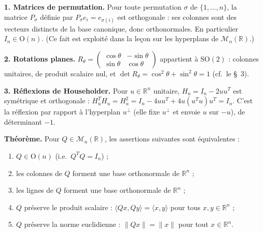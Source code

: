 
\begin{mdframed}[style=exbar]
  \textbf{1. Matrices de permutation.}\enspace%
  Pour toute permutation $\sigma$ de $\{1,\ldots,n\}$, la matrice $P_\sigma$
  définie par $P_\sigma e_i = e_{\sigma(i)}$ est orthogonale : ses colonnes sont
  des vecteurs distincts de la base canonique, donc orthonormales. En
  particulier $I_n \in \mathrm{O}(n)$. (Ce fait est exploité dans la leçon sur
  les hyperplans de $\mathcal{M}_n(\mathbb{R})$.)

  \smallskip\noindent
  \textbf{2. Rotations planes.}\enspace%
  $R_\theta = \begin{pmatrix}\cos\theta&-\sin\theta\\\sin\theta&\cos\theta\end{pmatrix}$
  appartient à $\mathrm{SO}(2)$ : colonnes unitaires, de produit scalaire nul,
  et $\det R_\theta = \cos^2\theta + \sin^2\theta = 1$ (cf.\ le §~3).

  \smallskip\noindent
  \textbf{3. Réflexions de Householder.}\enspace%
  Pour $u \in \mathbb{R}^n$ unitaire, $H_u = I_n - 2uu^T$ est symétrique et
  orthogonale : $H_u^TH_u = H_u^2 = I_n - 4uu^T + 4u(u^Tu)u^T = I_n$.
  C'est la réflexion par rapport à l'hyperplan $u^\perp$ (elle fixe $u^\perp$
  et envoie $u$ sur $-u$), de déterminant $-1$.
\end{mdframed}

\decsep{}


\begin{tcolorbox}[thmbox]
  \textbf{Théorème.}\enspace%
  Pour $Q \in \mathcal{M}_n(\mathbb{R})$, les assertions suivantes sont équivalentes :
  \begin{enumerate}
    \item $Q \in \mathrm{O}(n)$ (i.e.\ $Q^TQ = I_n$) ;
    \item les colonnes de $Q$ forment une base orthonormale de $\mathbb{R}^n$ ;
    \item les lignes de $Q$ forment une base orthonormale de $\mathbb{R}^n$ ;
    \item $Q$ préserve le produit scalaire : $\langle Qx, Qy\rangle = \langle x,y\rangle$
          pour tous $x,y\in\mathbb{R}^n$ ;
    \item $Q$ préserve la norme euclidienne : $\|Qx\| = \|x\|$ pour tout $x\in\mathbb{R}^n$.
  \end{enumerate}
\end{tcolorbox}

